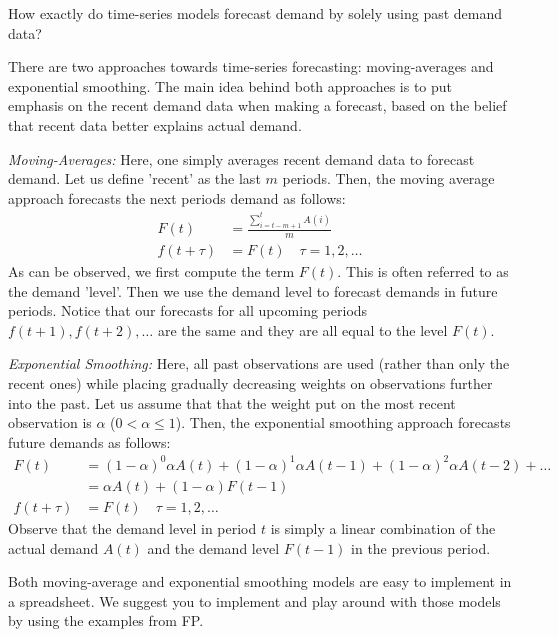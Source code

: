 \begin{exercise}
How exactly do time-series models forecast demand by solely using past demand data?



  \begin{solution}
There are two approaches towards time-series forecasting: moving-averages and exponential smoothing. The main idea behind both approaches is to put emphasis on the recent demand data when making a forecast, based on the belief that recent data better explains actual demand.

\textit{Moving-Averages:} 
Here, one simply averages recent demand data to forecast demand. Let us define 'recent' as the last $m$ periods. Then, the moving average approach forecasts the next periods demand as follows:
\begin{align*}
F(t) & = \frac{\sum_{i=t-m+1}^t A(i)}{m} \\
f(t+\tau) & = F(t) \quad \tau = 1,2,\ldots
\end{align*}
As can be observed, we first compute the term $F(t)$. This is often referred to as the demand 'level'. Then we use the demand level to forecast demands in future periods. Notice that our forecasts for all upcoming periods $f(t+1),f(t+2),\ldots$ are the same and they are all equal to the level $F(t)$. 

\textit{Exponential Smoothing:} 
Here, all past observations are used (rather than only the recent ones) while placing gradually decreasing weights on observations further into the past. Let us assume that that the weight put on the most recent observation is $\alpha$ ($0<\alpha\leq 1$). Then, the exponential smoothing approach forecasts future demands as follows:
\begin{align*}
F(t) & = (1-\alpha)^0 \alpha A(t) + (1-\alpha)^1 \alpha A(t-1) + (1-\alpha)^2 \alpha A(t-2) + \ldots \\
& = \alpha A(t) + (1-\alpha) F(t-1) \\
f(t+\tau) & = F(t) \quad \tau = 1,2,\ldots
\end{align*}
Observe that the demand level in period $t$ is simply a linear combination of the actual demand $A(t)$ and the demand level $F(t-1)$ in the previous period. 


Both moving-average and exponential smoothing models are easy to implement in a spreadsheet. We suggest you to implement and play around with those models by using the examples from FP.
  \end{solution}
\end{exercise}


